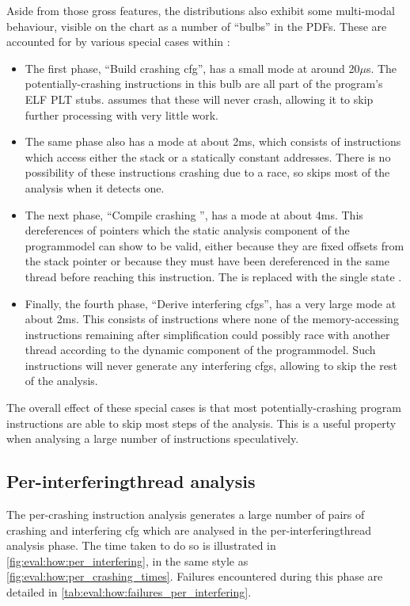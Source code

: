Aside from those gross features, the distributions also exhibit some
multi-modal behaviour, visible on the chart as a number of ``bulbs''
in the PDFs.  These are accounted for by various special cases within
{\implementation}:
\begin{itemize}
\item The first phase, ``Build crashing \gls{cfg}'', has a small mode
  at around 20$\mu$s.  The potentially-crashing instructions in this
  bulb are all part of the program's ELF PLT stubs.  {\Implementation}
  assumes that these will never crash, allowing it to skip further
  processing with very little work.
\item The same phase also has a mode at about 2ms, which consists of
  instructions which access either the stack or a statically constant
  addresses.  There is no possibility of these instructions crashing
  due to a race, so {\implementation} skips most of the analysis when
  it detects one.
\item The next phase, ``Compile crashing {\StateMachine}'', has a mode
  at about 4ms.  This dereferences of pointers which the static
  analysis component of the \gls{programmodel} can show to be valid,
  either because they are fixed offsets from the stack pointer or
  because they must have been dereferenced in the same thread before
  reaching this instruction.  The {\StateMachine} is replaced with the
  single state {\stSurvive}.
\item Finally, the fourth phase, ``Derive interfering \glspl{cfg}'',
  has a very large mode at about 2ms.  This consists of instructions
  where none of the memory-accessing instructions remaining after
  simplification could possibly race with another thread according to
  the dynamic component of the \gls{programmodel}.  Such instructions
  will never generate any interfering \glspl{cfg}, allowing
  {\technique} to skip the rest of the analysis.
\end{itemize}
The overall effect of these special cases is that most
potentially-crashing program instructions are able to skip most steps
of the analysis.  This is a useful property when analysing a large
number of instructions speculatively.

\subsection{Per-\gls{interferingthread} analysis}
\label{sect:eval:how:per_interfering}

The per-crashing instruction analysis generates a large number of
pairs of crashing {\StateMachine} and interfering \gls{cfg} which are
analysed in the per-\gls{interferingthread} analysis phase.  The time
taken to do so is illustrated in
\autoref{fig:eval:how:per_interfering}, in the same style as
\autoref{fig:eval:how:per_crashing_times}.  Failures encountered
during this phase are detailed in
\autoref{tab:eval:how:failures_per_interfering}.


